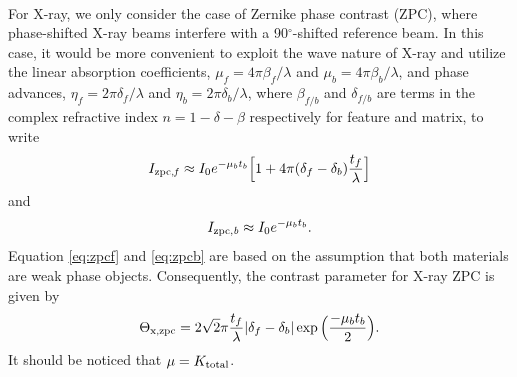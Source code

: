 \documentclass[review]{elsarticle}
\newcommand\nt{\textup{\scriptsize{0}}}
\newcommand\total{\textup{\scriptsize{total}}}
\newcommand\zpcf{\textup{\scriptsize{zpc,\textit f}}}
\newcommand\zpcb{\textup{\scriptsize{zpc,\textit b}}}
\newcommand\xzpc{\textup{\scriptsize{x,zpc}}}
\begin{document}
\paragraph{} For X-ray, we only consider the case of Zernike phase contrast (ZPC), where phase-shifted X-ray beams interfere with a 90$^\circ$-shifted reference beam. In this case, it would be more convenient to exploit the wave nature of X-ray and utilize the linear absorption coefficients, $\mu_f = 4\pi\beta_f/\lambda$ and $\mu_b = 4\pi\beta_b/\lambda$, and phase advances, $\eta_f = 2\pi\delta_f/\lambda$ and $\eta_b = 2\pi\delta_b/\lambda$, where $\beta_{f/b}$ and $\delta_{f/b}$ are terms in the complex refractive index $n = 1 - \delta - \beta$ respectively for feature and matrix, to write \cite{Jacobsen:ZMiInRZY}
\begin{equation}
I_{\zpcf} \approx I_{\nt} e^{-\mu_b t_b}\Big[ 1 + 4\pi(\delta_f - \delta_b)\frac{t_f}{\lambda}\Big]
\label{eq:zpcf}
\end{equation}
and
\begin{equation}
I_{\zpcb} \approx I_{\nt} e^{-\mu_b t_b}.
\label{eq:zpcb}
\end{equation}
Equation \ref{eq:zpcf} and \ref{eq:zpcb} are based on the assumption that both materials are weak phase objects. Consequently, the contrast parameter for X-ray ZPC is given by
\begin{equation}
\Theta_{\xzpc} = 2\sqrt{2}\pi\frac{t_f}{\lambda}|\delta_f - \delta_b|\exp\Big(\frac{-\mu_b t_b}{2}\Big).
\end{equation}
It should be noticed that $\mu = K_{\total}$.
\end{document}
